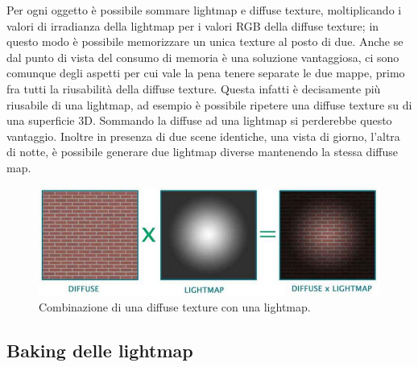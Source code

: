 Per ogni oggetto è possibile sommare lightmap e diffuse texture, moltiplicando i valori di irradianza della lightmap per i valori RGB della diffuse texture; in questo modo è possibile memorizzare un unica texture al posto di due. Anche se dal punto di vista del consumo di memoria è una soluzione vantaggiosa, ci sono comunque degli aspetti per cui vale la pena tenere separate le due mappe, primo fra tutti la riusabilità della diffuse texture.
Questa infatti è decisamente più riusabile di una lightmap, ad esempio è possibile ripetere una diffuse texture su di una superficie 3D. Sommando la diffuse ad una lightmap si perderebbe questo vantaggio. Inoltre in presenza di due scene identiche, una vista di giorno, l’altra di notte, è possibile generare due lightmap diverse mantenendo la stessa diffuse map.
\\
\begin{figure}[htb]
 \centering
 \includegraphics[width=0.8\linewidth]{images/chapter_stato_arte/stato_arte_diffuse_lightmap.png}\hfill
 \caption[Combinazione texture/lightmap]{Combinazione di una diffuse texture con una lightmap.}
 \label{fig:stato_arte_diffuse_lightmap}
\end{figure}

\subsection{Baking delle lightmap}
\label{sec:chapter_stato_arte_baking_lightmap}

